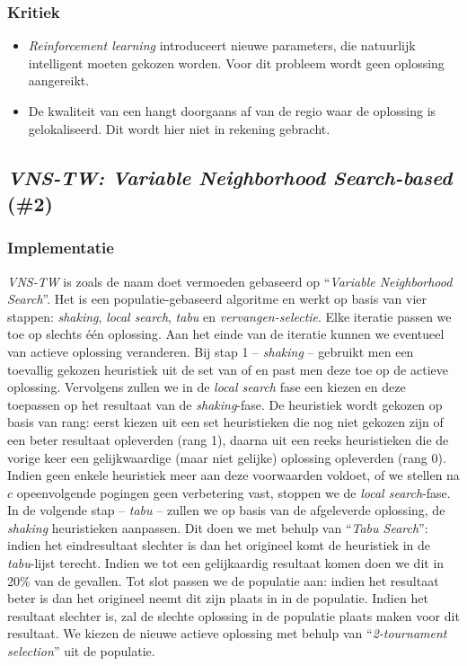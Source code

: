 \subsubsection{Kritiek}
\begin{itemize}
 \item \emph{Reinforcement learning} introduceert nieuwe parameters, die natuurlijk intelligent moeten gekozen worden. Voor dit probleem wordt geen oplossing aangereikt.
 \item De kwaliteit van een \abllh{} hangt doorgaans af van de regio waar de oplossing is gelokaliseerd. Dit wordt hier niet in rekening gebracht.
\end{itemize}
\subsection{\emph{VNS-TW: Variable Neighborhood Search-based} (\#2)}
\label{sss:vns-tw}
\subsubsection{Implementatie}
\emph{VNS-TW}\cite{chesc-vns-tw} is zoals de naam doet vermoeden gebaseerd op ``\emph{Variable Neighborhood Search}''\cite{hom/vns}. Het is een populatie-gebaseerd algoritme en werkt op basis van vier stappen: \emph{shaking}, \emph{local search}, \emph{tabu} en \emph{vervangen-selectie}. Elke iteratie passen we toe op slechts \'e\'en oplossing. Aan het einde van de iteratie kunnen we eventueel van actieve oplossing veranderen. Bij stap 1 -- \emph{shaking} -- gebruikt men een toevallig gekozen heuristiek uit de set van \abmt{} of \abrr{} \abllhn{} en past men deze toe op de actieve oplossing. Vervolgens zullen we in de \emph{local search} fase een \abls{} \abh{} kiezen en deze toepassen op het resultaat van de \emph{shaking}-fase. De heuristiek wordt gekozen op basis van rang: eerst kiezen uit een set heuristieken die nog niet gekozen zijn of een beter resultaat opleverden (rang 1), daarna uit een reeks heuristieken die de vorige keer een gelijkwaardige (maar niet gelijke) oplossing opleverden (rang 0). Indien geen enkele heuristiek meer aan deze  voorwaarden voldoet, of we stellen na $c$ opeenvolgende pogingen geen verbetering vast, stoppen we de \emph{local search}-fase. In de volgende stap -- \emph{tabu} -- zullen we op basis van de afgeleverde oplossing, de \emph{shaking} heuristieken aanpassen. Dit doen we met behulp van ``\emph{Tabu Search}''\cite{DBLP:journals/informs/Glover89}: indien het eindresultaat slechter is dan het origineel komt de heuristiek in de \emph{tabu}-lijst terecht. Indien we tot een gelijkaardig resultaat komen doen we dit in 20\% van de gevallen. Tot slot passen we de populatie aan: indien het resultaat beter is dan het origineel neemt dit zijn plaats in in de populatie. Indien het resultaat slechter is, zal de slechte oplossing in de populatie plaats maken voor dit resultaat. We kiezen de nieuwe actieve oplossing met behulp van ``\emph{2-tournament selection}''\cite{Miller95geneticalgorithms} uit de populatie.
